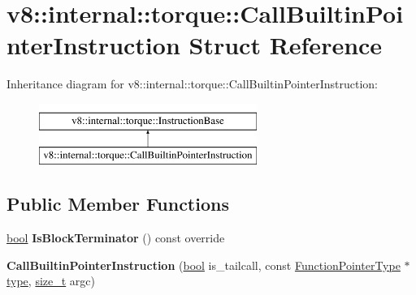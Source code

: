 \hypertarget{structv8_1_1internal_1_1torque_1_1CallBuiltinPointerInstruction}{}\section{v8\+:\+:internal\+:\+:torque\+:\+:Call\+Builtin\+Pointer\+Instruction Struct Reference}
\label{structv8_1_1internal_1_1torque_1_1CallBuiltinPointerInstruction}
Inheritance diagram for v8\+:\+:internal\+:\+:torque\+:\+:Call\+Builtin\+Pointer\+Instruction\+:\begin{figure}[H]
\begin{center}
\leavevmode
\includegraphics[height=2.000000cm]{structv8_1_1internal_1_1torque_1_1CallBuiltinPointerInstruction}
\end{center}
\end{figure}
\subsection*{Public Member Functions}
\begin{DoxyCompactItemize}
\item 
\mbox{\label{structv8_1_1internal_1_1torque_1_1CallBuiltinPointerInstruction_a93f92d34472969f3c8f4807f51650360}} 
\mbox{\hyperlink{classbool}{bool}} {\bfseries Is\+Block\+Terminator} () const override
\item 
\mbox{\label{structv8_1_1internal_1_1torque_1_1CallBuiltinPointerInstruction_af05ac30e3b0d3cb39d4bb63b7dfbec11}} 
{\bfseries Call\+Builtin\+Pointer\+Instruction} (\mbox{\hyperlink{classbool}{bool}} is\+\_\+tailcall, const \mbox{\hyperlink{classv8_1_1internal_1_1torque_1_1FunctionPointerType}{Function\+Pointer\+Type}} $\ast$\mbox{\hyperlink{classstd_1_1conditional_1_1type}{type}}, \mbox{\hyperlink{classsize__t}{size\+\_\+t}} argc)
\end{DoxyCompactItemize}
